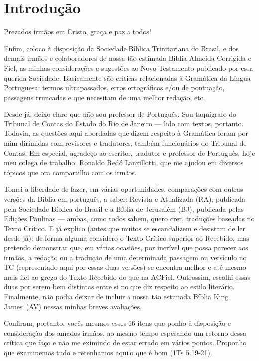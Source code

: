 \chapter*{Introdução}

Prezados irmãos em Cristo, graça e paz a todos!

Enfim, coloco à disposição da Sociedade Bíblica Trinitariana do
Brasil, e dos demais irmãos e colaboradores de nossa tão estimada
Bíblia Almeida Corrigida e Fiel, as minhas considerações e sugestões
ao Novo Testamento publicado por essa querida Sociedade. Basicamente
são críticas relacionadas à Gramática da Língua Portuguesa: termos
ultrapassados, erros ortográficos e/ou de pontuação, passagens
truncadas e que necesitam de uma melhor redação, etc.

Desde já, deixo claro que não sou professor de Português. Sou
taquígrafo do Tribunal de Contas do Estado do Rio de Janeiro --- lido
com textos, portanto. Todavia, as questões aqui abordadas que dizem
respeito à Gramática foram por mim dirimidas com revisores e
tradutores, também funcionários do Tribunal de Contas. Em especial,
agradeço ao escritor, tradutor e professor de Português, hoje meu
colega de trabalho, Ronaldo Redó Lanzillotti, que me ajudou em
diversos tópicos que ora compartilho com os irmãos.

Tomei a liberdade de fazer, em várias oportunidades, comparações com
outras versões da Bíblia em português, a saber: Revista e Atualizada
(RA), publicada pela Sociedade Bíblica do Brasil e a Bíblia de
Jerusalém (BJ), publicada pelas Edições Paulinas --- ambas, como todos
sabem, quero crer, traduções baseadas no Texto Crítico. E já explico
(antes que muitos se escandalizem e desistam de ler desde já): de
forma alguma considero o Texto Crítico superior ao Recebido, mas
pretendo demonstrar que, em várias ocasiões, por incrível que possa
parecer aos irmãos, a redação ou a tradução de uma determinada
passagem ou versículo no TC (representado aqui por essas duas versões)
se encontra melhor e até mesmo mais fiel ao grego do Texto Recebido do
que na ACFiel. Outrossim, escolhi essas duas por serem bem
distintas entre si no que diz respeito ao estilo literário.
Finalmente, não podia deixar de incluir a nossa tão estimada Bíblia King James~(AV) nessas minhas breves avaliações.

Confiram, portanto, vocês mesmos esses 66 itens que ponho à disposição
e consideração dos amados irmãos, ao mesmo tempo esperando um retorno
dessa crítica que faço e não me eximindo de estar errado em vários
pontos. Proponho que examinemos tudo e retenhamos aquilo que é bom
(1Ts 5.19-21).

